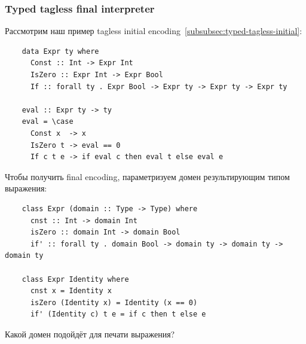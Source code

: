 \subsubsection{Typed tagless final interpreter}

Рассмотрим наш пример tagless initial encoding~\ref{subsubsec:typed-tagless-initial}:
\begin{verbatim}
    data Expr ty where
      Const :: Int -> Expr Int
      IsZero :: Expr Int -> Expr Bool
      If :: forall ty . Expr Bool -> Expr ty -> Expr ty -> Expr ty

    eval :: Expr ty -> ty
    eval = \case
      Const x  -> x
      IsZero t -> eval == 0
      If c t e -> if eval c then eval t else eval e
\end{verbatim}
Чтобы получить final encoding, параметризуем домен результирующим типом выражения:
\begin{verbatim}
    class Expr (domain :: Type -> Type) where
      cnst :: Int -> domain Int
      isZero :: domain Int -> domain Bool
      if' :: forall ty . domain Bool -> domain ty -> domain ty -> domain ty

    class Expr Identity where
      cnst x = Identity x
      isZero (Identity x) = Identity (x == 0)
      if' (Identity c) t e = if c then t else e
\end{verbatim}

\begin{task}
    Какой домен подойдёт для печати выражения?
\end{task}

